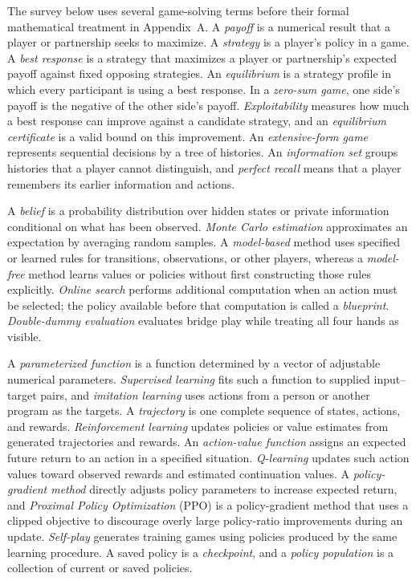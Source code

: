 \documentclass[11pt]{article}
\begin{document}
The survey below uses several game-solving terms before their formal mathematical treatment in Appendix~A. A \emph{payoff} is a numerical result that a player or partnership seeks to maximize. A \emph{strategy} is a player's policy in a game. A \emph{best response} is a strategy that maximizes a player or partnership's expected payoff against fixed opposing strategies. An \emph{equilibrium} is a strategy profile in which every participant is using a best response. In a \emph{zero-sum game}, one side's payoff is the negative of the other side's payoff. \emph{Exploitability} measures how much a best response can improve against a candidate strategy, and an \emph{equilibrium certificate} is a valid bound on this improvement. An \emph{extensive-form game} represents sequential decisions by a tree of histories. An \emph{information set} groups histories that a player cannot distinguish, and \emph{perfect recall} means that a player remembers its earlier information and actions.

A \emph{belief} is a probability distribution over hidden states or private information conditional on what has been observed. \emph{Monte Carlo estimation} approximates an expectation by averaging random samples. A \emph{model-based} method uses specified or learned rules for transitions, observations, or other players, whereas a \emph{model-free} method learns values or policies without first constructing those rules explicitly. \emph{Online search} performs additional computation when an action must be selected; the policy available before that computation is called a \emph{blueprint}. \emph{Double-dummy evaluation} evaluates bridge play while treating all four hands as visible.

A \emph{parameterized function} is a function determined by a vector of adjustable numerical parameters. \emph{Supervised learning} fits such a function to supplied input--target pairs, and \emph{imitation learning} uses actions from a person or another program as the targets. A \emph{trajectory} is one complete sequence of states, actions, and rewards. \emph{Reinforcement learning} updates policies or value estimates from generated trajectories and rewards. An \emph{action-value function} assigns an expected future return to an action in a specified situation. \emph{Q-learning} updates such action values toward observed rewards and estimated continuation values. A \emph{policy-gradient method} directly adjusts policy parameters to increase expected return, and \emph{Proximal Policy Optimization} (PPO) is a policy-gradient method that uses a clipped objective to discourage overly large policy-ratio improvements during an update. \emph{Self-play} generates training games using policies produced by the same learning procedure. A saved policy is a \emph{checkpoint}, and a \emph{policy population} is a collection of current or saved policies.
\end{document}
